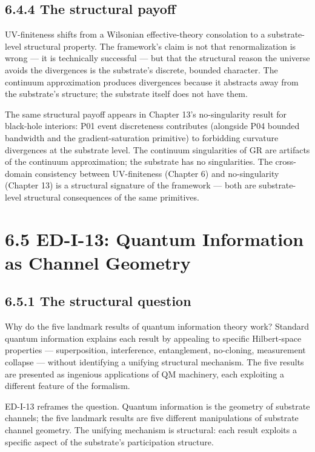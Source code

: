 \documentclass[11pt]{book}
\begin{document}
\subsection{6.4.4 The structural payoff}

UV-finiteness shifts from a Wilsonian effective-theory consolation to a substrate-level structural property. The framework's claim is not that renormalization is wrong — it is technically successful — but that the structural reason the universe avoids the divergences is the substrate's discrete, bounded character. The continuum approximation produces divergences because it abstracts away from the substrate's structure; the substrate itself does not have them.

The same structural payoff appears in Chapter 13's no-singularity result for black-hole interiors: P01 event discreteness contributes (alongside P04 bounded bandwidth and the gradient-saturation primitive) to forbidding curvature divergences at the substrate level. The continuum singularities of GR are artifacts of the continuum approximation; the substrate has no singularities. The cross-domain consistency between UV-finiteness (Chapter 6) and no-singularity (Chapter 13) is a structural signature of the framework — both are substrate-level structural consequences of the same primitives.

\section{6.5 ED-I-13: Quantum Information as Channel Geometry}

\subsection{6.5.1 The structural question}

Why do the five landmark results of quantum information theory work? Standard quantum information explains each result by appealing to specific Hilbert-space properties — superposition, interference, entanglement, no-cloning, measurement collapse — without identifying a unifying structural mechanism. The five results are presented as ingenious applications of QM machinery, each exploiting a different feature of the formalism.

ED-I-13 reframes the question. Quantum information is the geometry of substrate channels; the five landmark results are five different manipulations of substrate channel geometry. The unifying mechanism is structural: each result exploits a specific aspect of the substrate's participation structure.
\end{document}

